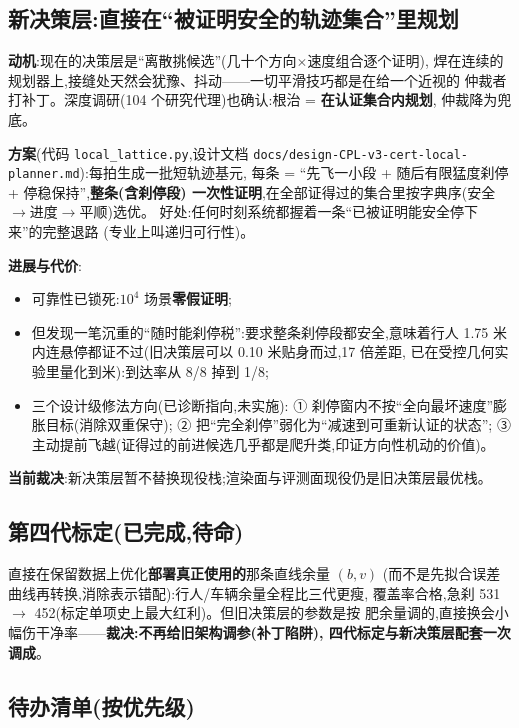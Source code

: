 \documentclass[11pt]{ctexart}
\newcommand{\code}[1]{\texttt{#1}}
\begin{document}
\subsection{新决策层:直接在``被证明安全的轨迹集合''里规划}

\textbf{动机}:现在的决策层是``离散挑候选''(几十个方向$\times$速度组合逐个证明),
焊在连续的规划器上,接缝处天然会犹豫、抖动——一切平滑技巧都是在给一个近视的
仲裁者打补丁。深度调研(104 个研究代理)也确认:根治 = \textbf{在认证集合内规划},
仲裁降为兜底。

\textbf{方案}(代码 \code{local\_lattice.py},设计文档
\code{docs/design-CPL-v3-cert-local-planner.md}):每拍生成一批短轨迹基元,
每条 = ``先飞一小段 + 随后有限猛度刹停 + 停稳保持'',\textbf{整条(含刹停段)
一次性证明},在全部证得过的集合里按字典序(安全$\to$进度$\to$平顺)选优。
好处:任何时刻系统都握着一条``已被证明能安全停下来''的完整退路
(专业上叫递归可行性)。

\textbf{进展与代价}:
\begin{itemize}
  \item 可靠性已锁死:$10^4$ 场景\textbf{零假证明};
  \item 但发现一笔沉重的``随时能刹停税'':要求整条刹停段都安全,意味着行人
        1.75 米内连悬停都证不过(旧决策层可以 0.10 米贴身而过,17 倍差距,
        已在受控几何实验里量化到米):到达率从 8/8 掉到 1/8;
  \item 三个设计级修法方向(已诊断指向,未实施):
        ① 刹停窗内不按``全向最坏速度''膨胀目标(消除双重保守);
        ② 把``完全刹停''弱化为``减速到可重新认证的状态'';
        ③ 主动提前飞越(证得过的前进候选几乎都是爬升类,印证方向性机动的价值)。
\end{itemize}
\textbf{当前裁决}:新决策层暂不替换现役栈;渲染面与评测面现役仍是旧决策层最优栈。

\subsection{第四代标定(已完成,待命)}

直接在保留数据上优化\textbf{部署真正使用的}那条直线余量 $(b, v)$
(而不是先拟合误差曲线再转换,消除表示错配):行人/车辆余量全程比三代更瘦,
覆盖率合格,急刹 531 $\to$ 452(标定单项史上最大红利)。但旧决策层的参数是按
肥余量调的,直接换会小幅伤干净率——\textbf{裁决:不再给旧架构调参(补丁陷阱),
四代标定与新决策层配套一次调成}。

\subsection{待办清单(按优先级)}
\end{document}
